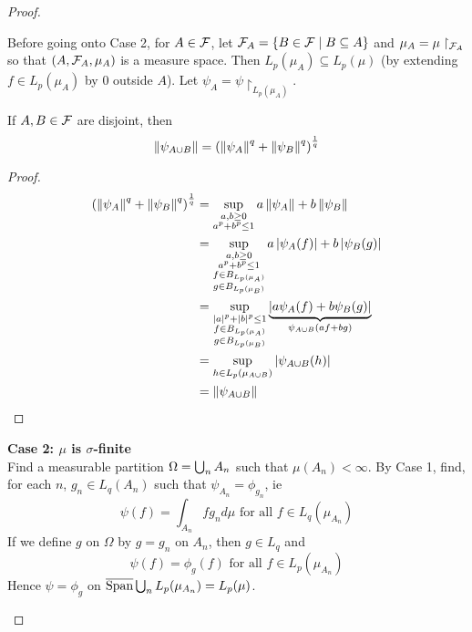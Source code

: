 \documentclass{article}
\begin{document}
\begin{proof}
\begin{enumerate}
    Before going onto Case 2, for $A \in \mathcal F$, let $\mathcal F_A = \{B \in \mathcal F \mid B \subseteq A\}$ and $\mu_A = \mu\restriction_{\mathcal F_A}$ so that $(A, \mathcal F_A, \mu_A)$ is a measure space. Then $L_p(\mu_A) \subseteq L_p(\mu)$ (by extending $f \in L_p(\mu_A)$ by $0$ outside $A$). Let $\psi_A = \psi\restriction_{L_p(\mu_A)}$.

    \newlec

    \begin{claim}
      If $A, B \in \mathcal F$ are disjoint, then
      $$\left\lVert \psi_{A \cup B}\right\rVert = \left(\left\lVert \psi_A\right\rVert^q + \left\lVert \psi_B\right\rVert^q\right)^{\frac 1q}$$
    \end{claim}
    \begin{proof}
      \begin{align*}
        \left(\left\lVert \psi_A\right\rVert^q + \left\lVert \psi_B\right\rVert^q\right)^{\frac 1q}
        & = \sup_{\substack{a, b \ge 0 \\ a^p + b^p \le 1}} a\left\lVert \psi_A\right\rVert + b\left\lVert \psi_B\right\rVert \\
        & = \sup_{\substack{a, b \ge 0 \\ a^p + b^p \le 1 \\ f \in B_{L_p(\mu_A)} \\ g \in B_{L_p(\mu_B)}}} a\left\lvert \psi_A(f)\right\rvert + b\left\lvert \psi_B(g)\right\rvert \\
        & = \sup_{\substack{\left\lvert a\right\rvert^p + \left\lvert b\right\rvert^p \le 1 \\ f \in B_{L_p(\mu_A)} \\ g \in B_{L_p(\mu_B)}}} \underbrace{\left\lvert a\psi_A(f) + b\psi_B(g)\right\rvert}_{\psi_{A \cup B}(af + bg)} \\
        & = \sup_{h \in L_p(\mu_{A \cup B})} \left\lvert \psi_{A \cup B}(h)\right\rvert \\
        & = \left\lVert \psi_{A \cup B}\right\rVert
      \end{align*}
    \end{proof}

    {\bf Case 2: $\mu$ is $\sigma$-finite} \\
    Find a measurable partition $\Omega = \bigcup_n A_n$ such that $\mu(A_n) < \infty$. By Case 1, find, for each $n$, $g_n \in L_q(A_n)$ such that $\psi_{A_n} = \phi_{g_n}$, ie
    $$\psi(f) = \int_{A_n} fg_n d\mu \text{ for all } f \in L_q(\mu_{A_n})$$
    If we define $g$ on $\Omega$ by $g = g_n$ on $A_n$, then $g \in L_q$ and
    $$\psi(f) = \phi_g(f) \text{ for all } f \in L_p(\mu_{A_n})$$
    Hence $\psi = \phi_g$ on $\overline{\operatorname{Span}}\bigcup_n L_p(\mu_{A_n}) = L_p(\mu)$.


\end{enumerate}
\end{proof}
\end{document}
